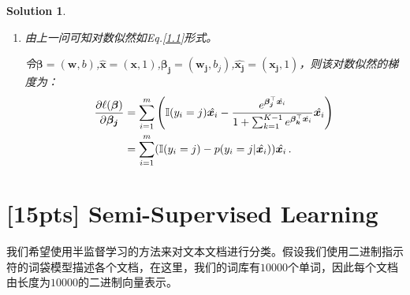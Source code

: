 \documentclass[a4paper,UTF8]{article}
\numberwithin{equation}{section}
\newtheorem*{solution}{Solution}
\begin{document}
\begin{solution}
\begin{enumerate}[(1)]
			设数据集为$\{(x_i,y_i)\}_{i=1}^{m}$，对于任意$y_i$，有
			\begin{equation*}
			\centering
			\begin{split}
			\sum_{j=1}^{K}\mathbb{I}(y_i=j)=1 
			\end{split}
			\end{equation*}
			则对数似然如下，
			\begin{equation} \label{1.1}
			\centering
			\begin{split}
			\ell(w,b) &= \sum_{i=1}^{m} {\sum_{j=1}^{K} {\mathbb{I}(y_i=j)\ln p(y_i=j|\bm{x}_i)}} \\
			&= \sum_{i=1}^{m} \left(\sum_{j=1}^{K-1} \mathbb{I}(y_i=j)(\bm{w}^{\top}_{j}\bm{x}_i+b_{j}+\ln p(y_i=K|\bm{x}_i) ) + \mathbb{I}(y_i=K)\ln p(y_i=K|\bm{x}_i)\right) \\
			&= \sum_{i=1}^{m} \left(\sum_{j=1}^{K-1} \mathbb{I}(y_i=j)(\bm{w}^{\top}_{j}\bm{x}_i+b_{j}) + \sum_{j=1}^{K} \mathbb{I}(y_i=j)\ln p(y_i=K|\bm{x}_i)\right) \\
			&= \sum_{i=1}^{m} \left(\sum_{j=1}^{K-1} \mathbb{I}(y_i=j)(\bm{w}^{\top}_{j}\bm{x}_i+b_{j}) - \ln(1+\sum_{k=1}^{K-1}e^{\bm{\bm{w}^{\top}_{k}\bm{x}_i+b_{k}}})\right)
			\end{split}
			\end{equation}
			
			\item 由上一问可知对数似然如Eq.\ref{1.1}形式。
			
			令$\bm{\beta}=(\bm{w},b)$,$\hat{\bm{x}} = (\bm{x},1)$,$\bm{\beta_j}=(\bm{w_j},b_j)$,$\hat{\bm{x_j}} = (\bm{x_j},1)$，则该对数似然的梯度为：
			\begin{equation}
			\centering
			\begin{split}
			\frac{\partial \ell(\bm{\beta})}{\partial \bm{\beta_j}} &= \sum_{i=1}^{m}\left(\mathbb{I}(y_i=j)\hat{\bm{x}_i}-\frac{e^{\bm{\beta_j}^{\top}\hat{\bm{x}_i}}}{1+\sum_{k=1}^{K-1}e^{\bm{\beta_k}^{\top}\hat{\bm{x}_i}}}\hat{\bm{x}_i} \right) \\
			&= \sum_{i=1}^{m} (\mathbb{I}(y_i=j)-p(y_i=j|\hat{\bm{x}_i})) \hat{\bm{x}_i} \,.\\
			\end{split}
			\end{equation}
		\end{enumerate}
		
	\end{solution}
	\newpage
	
	\section{[15pts] Semi-Supervised Learning}
	我们希望使用半监督学习的方法来对文本文档进行分类。假设我们使用二进制指示符的词袋模型描述各个文档，在这里，我们的词库有$10000$个单词，因此每个文档由长度为$10000$的二进制向量表示。
	
\end{document}
